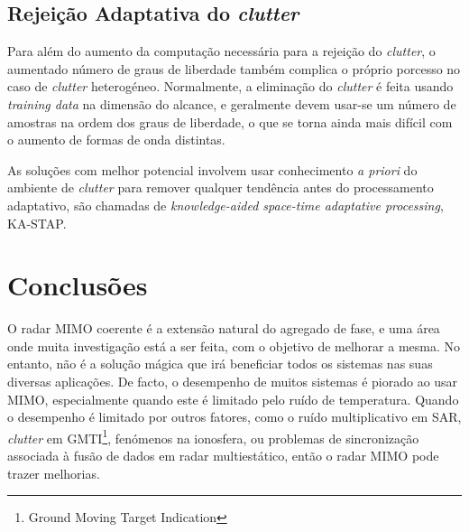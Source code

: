 \documentclass[purist,portuguese]{ist-report}
\begin{document}
\subsection{Rejeição Adaptativa do \textit{clutter}}

Para além do aumento da computação necessária para a rejeição do \textit{clutter}, o aumentado número de graus de liberdade também complica o próprio porcesso no caso de \textit{clutter} heterogéneo. 
Normalmente, a eliminação do \textit{clutter} é feita usando \textit{training data} na dimensão do alcance, e geralmente devem usar-se um número de amostras na ordem dos graus de liberdade, o que se torna ainda mais difícil com o aumento de formas de onda distintas.

As soluções com melhor potencial involvem usar conhecimento \emph{a priori} do ambiente de \textit{clutter} para remover qualquer tendência antes do processamento adaptativo, são chamadas de \textit{knowledge-aided space-time adaptative processing}, KA-STAP.

\section{Conclusões}

O radar MIMO coerente é a extensão natural do agregado de fase, e uma área onde muita investigação está a ser feita, com o objetivo de melhorar a mesma.
No entanto, não é a solução mágica que irá beneficiar todos os sistemas nas suas diversas aplicações. De facto, o desempenho de muitos sistemas é piorado ao usar MIMO, especialmente quando este é limitado pelo ruído de temperatura.
Quando o desempenho é limitado por outros fatores, como o ruído multiplicativo em SAR, \textit{clutter} em GMTI\footnote{Ground Moving Target Indication}, fenómenos na ionosfera, ou problemas de sincronização associada à fusão de dados em radar multiestático, então o radar MIMO pode trazer melhorias.






\nocite{radarhandbook,radarsystems,davis2015mimo,li2018mimo,radartutorial,sturm2013spectrally,chen2008mimo,nrcan,mimoradarbook}
\printbibliography

\listoftodos
\end{document}
